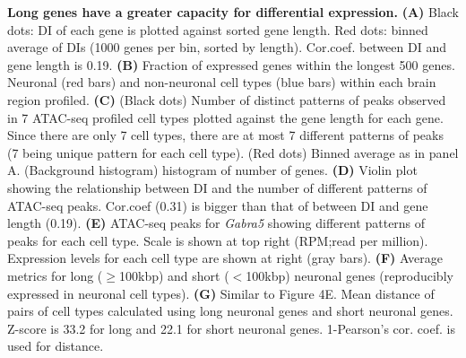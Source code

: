 \textbf{Long genes have a greater capacity for differential expression.}
\textbf{(A)} Black dots: DI of each gene is plotted against sorted gene length. Red dots: binned average of DIs (1000 genes per bin, sorted by length). Cor.coef. between DI and gene length is 0.19. 
\textbf{(B)} Fraction of expressed genes within the longest 500 genes. Neuronal (red bars) and non-neuronal cell types (blue bars) within each brain region profiled.
\textbf{(C)} (Black dots) Number of distinct patterns of peaks observed in 7 ATAC-seq profiled cell types plotted against the gene length for each gene. Since there are only 7 cell types, there are at most 7 different patterns of peaks (7 being unique pattern for each cell type). (Red dots) Binned average as in panel A. (Background histogram) histogram of number of genes. 
\textbf{(D)} Violin plot showing the relationship between DI and the number of different patterns of ATAC-seq peaks. Cor.coef (0.31) is bigger than that of between DI and gene length (0.19).
\textbf{(E)} ATAC-seq peaks for \textit{Gabra5} showing different patterns of peaks for each cell type. Scale is shown at top right (RPM;read per million).  Expression levels for each cell type are shown at right (gray bars).
\textbf{(F)} Average metrics for long ($\geq$100kbp) and short ($<$100kbp) neuronal genes (reproducibly expressed in neuronal cell types). 
\textbf{(G)} Similar to Figure 4E. Mean distance of pairs of cell types calculated using long neuronal genes and short neuronal genes. Z-score is 33.2 for long and 22.1 for short neuronal genes. 1-Pearson's cor. coef. is used for distance.

